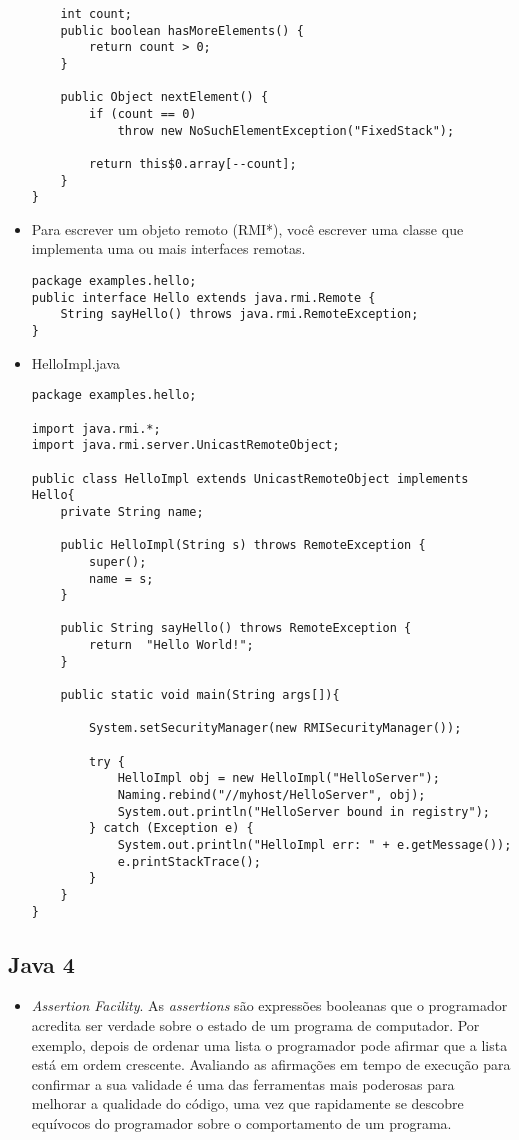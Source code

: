 \begin{itemize}
\begin{lstlisting}
	int count;
	public boolean hasMoreElements() {
		return count > 0;
	}
		
	public Object nextElement() {
		if (count == 0)
			throw new NoSuchElementException("FixedStack");
		
		return this$0.array[--count];
	}
}
\end{lstlisting}
			
			\item Para escrever um objeto remoto (RMI*), você escrever uma classe que implementa uma ou mais interfaces remotas. 
			
\begin{lstlisting}
package examples.hello;
public interface Hello extends java.rmi.Remote {
	String sayHello() throws java.rmi.RemoteException;
}
\end{lstlisting}
	 
\item HelloImpl.java
\begin{lstlisting}
package examples.hello;

import java.rmi.*;
import java.rmi.server.UnicastRemoteObject;

public class HelloImpl extends UnicastRemoteObject implements Hello{
	private String name;
	
	public HelloImpl(String s) throws RemoteException {
		super();
		name = s;
	}
	
	public String sayHello() throws RemoteException {
		return  "Hello World!";
	}
	
	public static void main(String args[]){
	
		System.setSecurityManager(new RMISecurityManager());
	
		try {
			HelloImpl obj = new HelloImpl("HelloServer");
			Naming.rebind("//myhost/HelloServer", obj);
			System.out.println("HelloServer bound in registry");
		} catch (Exception e) {
			System.out.println("HelloImpl err: " + e.getMessage());
			e.printStackTrace();
		}
	}
}
\end{lstlisting}
		\end{itemize}


	\clearpage
	\subsection {Java 4}
	  \begin{itemize}
		  \item {\it Assertion Facility}. As {\it assertions} são expressões booleanas que o programador acredita ser verdade sobre o estado de um programa de computador. Por exemplo, depois de ordenar uma lista o programador pode afirmar que a lista está em ordem crescente. Avaliando as afirmações em tempo de execução para confirmar a sua validade é uma das ferramentas mais poderosas para melhorar a qualidade do código, uma vez que rapidamente se descobre equívocos do programador sobre o comportamento de um programa.
	  \end{itemize}
	
